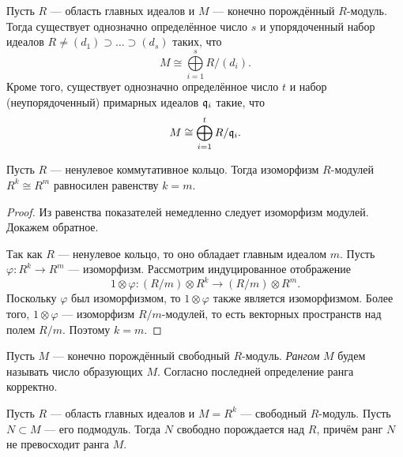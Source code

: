 
\begin{theorem} \label{classification}
	Пусть $ R $ --- область главных идеалов и $ M $ --- конечно порождённый $ R $-модуль.
	Тогда существует однозначно определённое число $ s $ и 
	упорядоченный набор идеалов $ R \neq (d_1) \supset \ldots \supset (d_s) $ таких, что
	$$ M \cong \bigoplus\limits_{i = 1}^{s} R / (d_i). $$
	Кроме того, существует однозначно определённое число $ t $
	и набор (неупорядоченный) примарных идеалов $ \mathfrak{q}_i $
	такие, что
	$$ M \cong \bigoplus\limits_{i = 1}^{t} R / \mathfrak{q}_i. $$
\end{theorem}

\begin{lemma} \label{rank}
	Пусть $ R $ --- ненулевое коммутативное кольцо.
	Тогда изоморфизм $ R $-модулей $ R^k \cong R^m $ равносилен равенству $ k = m $.
\end{lemma}

\begin{proof}
	Из равенства показателей немедленно следует изоморфизм модулей. Докажем обратное.
	
	Так как $ R $ --- ненулевое кольцо, то оно обладает главным идеалом $ m $.
	Пусть $ \varphi \colon R^k \to R^m $ --- изоморфизм.
	Рассмотрим индуцированное отображение 
	$$ 1 \otimes \varphi \colon (R/m) \otimes R^k \to (R/m) \otimes R^m. $$
	Поскольку $ \varphi $ был изоморфизмом, то $ 1 \otimes \varphi $ также является изоморфизмом.
	Более того, $ 1 \otimes \varphi $ --- изоморфизм $ R/m $-модулей, 
	то есть векторных пространств над полем $ R/m $. Поэтому $ k = m $.
\end{proof}

Пусть $ M $ --- конечно порождённый свободный $ R $-модуль. 
\textit{Рангом} $ M $ будем называть число образующих $ M $.
Согласно последней определение ранга корректно.

\begin{lemma} \label{free submodule}
	Пусть $ R $ --- область главных идеалов и $ M = R^k $ --- свободный $ R $-модуль.
	Пусть $ N \subset M $ --- его подмодуль. Тогда $ N $ свободно порождается над $ R $,
	причём ранг $ N $ не превосходит ранга $ M $.
\end{lemma}

